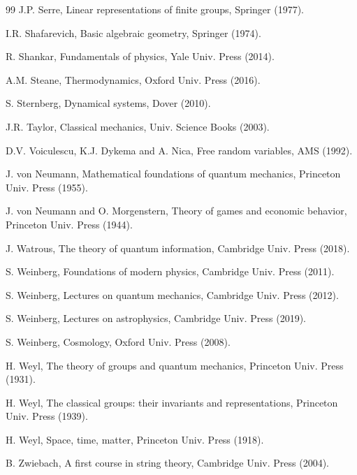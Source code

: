 \documentclass[12pt]{amsbook}
\begin{document}
\begin{thebibliography}{99}
J.P. Serre, Linear representations of finite groups, Springer (1977).

I.R. Shafarevich, Basic algebraic geometry, Springer (1974).

R. Shankar, Fundamentals of physics, Yale Univ. Press (2014).

A.M. Steane, Thermodynamics, Oxford Univ. Press (2016).

S. Sternberg, Dynamical systems, Dover (2010).

J.R. Taylor, Classical mechanics, Univ. Science Books (2003).

D.V. Voiculescu, K.J. Dykema and A. Nica, Free random variables, AMS (1992).

J. von Neumann, Mathematical foundations of quantum mechanics, Princeton Univ. Press (1955).

J. von Neumann and O. Morgenstern, Theory of games and economic behavior, Princeton Univ. Press (1944).

J. Watrous, The theory of quantum information, Cambridge Univ. Press (2018).

S. Weinberg, Foundations of modern physics, Cambridge Univ. Press (2011).

S. Weinberg, Lectures on quantum mechanics, Cambridge Univ. Press (2012).

S. Weinberg, Lectures on astrophysics, Cambridge Univ. Press (2019).

S. Weinberg, Cosmology, Oxford Univ. Press (2008).

H. Weyl, The theory of groups and quantum mechanics, Princeton Univ. Press (1931).

H. Weyl, The classical groups: their invariants and representations, Princeton Univ. Press (1939).

H. Weyl, Space, time, matter, Princeton Univ. Press (1918).

B. Zwiebach, A first course in string theory, Cambridge Univ. Press (2004).

\end{thebibliography}

\baselineskip=14pt

\printindex
\end{document}
